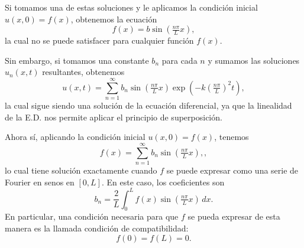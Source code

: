 \documentclass[11pt,letterpaper,draft]{report}
\theoremstyle{plain}
\theoremstyle{definition}
\theoremstyle{remark}
\newcommand\<{\langle}
\renewcommand\>{\rangle}
\begin{document}
Si tomamos una de estas soluciones y le aplicamos la condición
inicial $u(x,0)=f(x)$, obtenemos la ecuación
\[
  f(x) = b \sin(\tfrac{n\pi}{L}x)
,\]
la cual no se puede satisfacer para cualquier función $f(x)$.

Sin embargo, si tomamos una constante $b_n$ para cada $n$ y
sumamos las soluciones $u_n(x,t)$ resultantes, obtenemos
\begin{equation}
  u(x,t)
  = \sum_{n=1}^{\infty}
  b_n\sin(\tfrac{n\pi}{L}x)\exp(-k(\tfrac{n\pi}{L})^2t),
\end{equation}
la cual sigue siendo una solución de la ecuación diferencial, ya
que la linealidad de la E.D. nos permite aplicar
el principio de superposición.

Ahora sí, aplicando la condición inicial $u(x,0)=f(x)$, tenemos
\[
  f(x)
  = \sum_{n=1}^{\infty}
  b_n\sin(\tfrac{n\pi}{L}x),
,\]
lo cual tiene solución exactamente cuando $f$ se puede expresar
como una serie de Fourier en senos en $[0,L]$. En este caso, los
coeficientes son
\[
  b_n = \frac{2}{L}\int_0^L f(x)\sin(\tfrac{n\pi}{L}x)\,dx
.\]
En particular, una condición necesaria para que $f$ se pueda
expresar de esta manera es la llamada condición de
compatibilidad:
\[
  f(0)=f(L)=0
.\]
\end{document}
